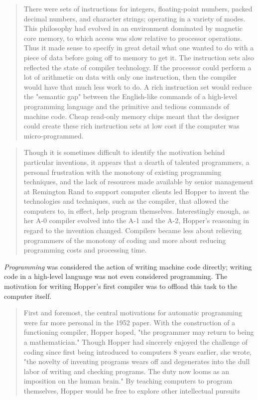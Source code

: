 \begin{quotation}
There were sets of instructions for integers, floating-point numbers, packed decimal numbers, and character
strings; operating in a variety of modes. This philosophy had evolved in an environment dominated by
magnetic core memory, to which access was slow relative to processor operations. Thus it made sense to
specify in great detail what one wanted to do with a piece of data before going off to memory to get it. The
instruction sets also reflected the state of compiler technology. If the processor could perform a lot of
arithmetic on data with only one instruction, then the compiler would have that much less work to do. A rich
instruction set would reduce the "semantic gap" between the English-like commands of a high-level
programming language and the primitive and tedious commands of machine code. Cheap read-only memory
chips meant that the designer could create these rich instruction sets at low cost if the computer was micro-programmed.
\end{quotation}



\begin{quotation}
Though it is sometimes difficult to identify the motivation behind particular 
inventions, it appears that a dearth of talented programmers, a personal 
frustration with the monotony of existing programming techniques, and the lack of resources 
made available by senior management at Remington Rand to support computer 
clients led Hopper to invent the technologies and techniques, such as the compiler, 
that allowed the computers to, in effect, help program themselves. 
Interestingly enough, as her A-0 compiler evolved into the A-1 and the A-2, 
Hopper's reasoning in regard to the invention changed. Compilers became less 
about relieving 
programmers of the monotony of coding and more about reducing programming costs and processing time.
\end{quotation}

\textit{Programming} was considered the action of writing machine code directly;
writing code in a high-level language was not even considered programming.
The motivation for writing Hopper's first compiler was to offload this task
to the computer itself.

\begin{quotation}
First and
foremost, the central motivations for automatic programming
were far more personal in the 1952 paper. With the construction
of a functioning compiler, Hopper hoped, "the programmer
may return to being a mathematician." Though Hopper had
sincerely enjoyed the challenge of coding since first being introduced to computers 8 years earlier, she wrote, "the novelty of
inventing programs wears off and degenerates into the dull labor
of writing and checking programs. The duty now looms as an
imposition on the human brain." By teaching computers to
program themselves, Hopper would be free to explore other
intellectual pursuits 
\end{quotation}

